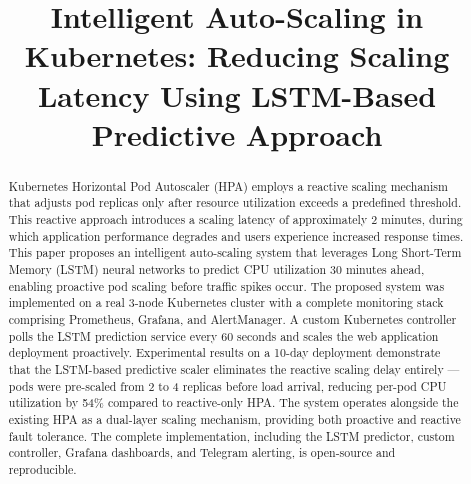 \documentclass[journal]{IEEEtran}
\begin{document}
\title{Intelligent Auto-Scaling in Kubernetes: Reducing Scaling Latency Using LSTM-Based Predictive Approach}

\author{
\and
{}
}

\maketitle

\begin{abstract}
Kubernetes Horizontal Pod Autoscaler (HPA) employs a reactive scaling mechanism that adjusts pod replicas only after resource utilization exceeds a predefined threshold. This reactive approach introduces a scaling latency of approximately 2 minutes, during which application performance degrades and users experience increased response times. This paper proposes an intelligent auto-scaling system that leverages Long Short-Term Memory (LSTM) neural networks to predict CPU utilization 30 minutes ahead, enabling proactive pod scaling before traffic spikes occur. The proposed system was implemented on a real 3-node Kubernetes cluster with a complete monitoring stack comprising Prometheus, Grafana, and AlertManager. A custom Kubernetes controller polls the LSTM prediction service every 60 seconds and scales the web application deployment proactively. Experimental results on a 10-day deployment demonstrate that the LSTM-based predictive scaler eliminates the reactive scaling delay entirely --- pods were pre-scaled from 2 to 4 replicas before load arrival, reducing per-pod CPU utilization by 54\% compared to reactive-only HPA. The system operates alongside the existing HPA as a dual-layer scaling mechanism, providing both proactive and reactive fault tolerance. The complete implementation, including the LSTM predictor, custom controller, Grafana dashboards, and Telegram alerting, is open-source and reproducible.
\end{abstract}
\end{document}
